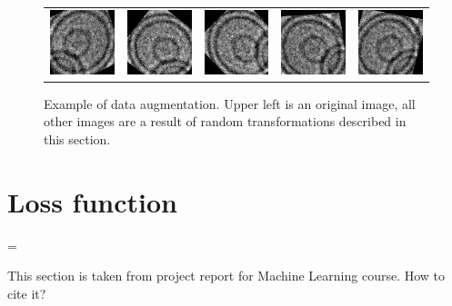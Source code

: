 \documentclass[a4paper, 11pt, table]{article}
\newenvironment{warning}
  {\par\begin{mdframed}[linewidth=2pt,linecolor=red]%
    \begin{list}{}{\leftmargin=1cm
                   \labelwidth=\leftmargin}\item[\Large\ding{43}]}
  {\end{list}\end{mdframed}\par}
\begin{document}
\begin{figure}[H]
\begin{tabular}{ccccc}
\includegraphics[scale=0.5]{augmented/_0_7140.jpeg} & \includegraphics[scale=0.5]{augmented/_0_7746.jpeg} & \includegraphics[scale=0.5]{augmented/_0_8553.jpeg} & \includegraphics[scale=0.5]{augmented/_0_8763.jpeg} & \includegraphics[scale=0.5]{augmented/_0_9361.jpeg} 
	
\end{tabular}
\caption{Example of data augmentation. Upper left is an original image, all other images are a result of random transformations described in this section.}
\label{fig:augmented_images}
\end{figure}

\section{Loss function}
\label{sec:loss_function}

\begin{warning}
This section is taken from project report for Machine Learning course. How to cite it?
\end{warning}
\end{document}
